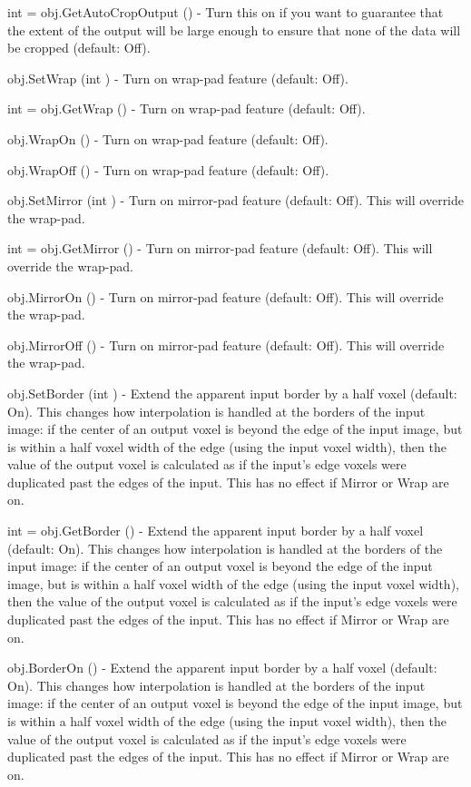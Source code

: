 \begin{DoxyItemize}
\item {\ttfamily int = obj.\-Get\-Auto\-Crop\-Output ()} -\/ Turn this on if you want to guarantee that the extent of the output will be large enough to ensure that none of the data will be cropped (default\-: Off).  
\item {\ttfamily obj.\-Set\-Wrap (int )} -\/ Turn on wrap-\/pad feature (default\-: Off).  
\item {\ttfamily int = obj.\-Get\-Wrap ()} -\/ Turn on wrap-\/pad feature (default\-: Off).  
\item {\ttfamily obj.\-Wrap\-On ()} -\/ Turn on wrap-\/pad feature (default\-: Off).  
\item {\ttfamily obj.\-Wrap\-Off ()} -\/ Turn on wrap-\/pad feature (default\-: Off).  
\item {\ttfamily obj.\-Set\-Mirror (int )} -\/ Turn on mirror-\/pad feature (default\-: Off). This will override the wrap-\/pad.  
\item {\ttfamily int = obj.\-Get\-Mirror ()} -\/ Turn on mirror-\/pad feature (default\-: Off). This will override the wrap-\/pad.  
\item {\ttfamily obj.\-Mirror\-On ()} -\/ Turn on mirror-\/pad feature (default\-: Off). This will override the wrap-\/pad.  
\item {\ttfamily obj.\-Mirror\-Off ()} -\/ Turn on mirror-\/pad feature (default\-: Off). This will override the wrap-\/pad.  
\item {\ttfamily obj.\-Set\-Border (int )} -\/ Extend the apparent input border by a half voxel (default\-: On). This changes how interpolation is handled at the borders of the input image\-: if the center of an output voxel is beyond the edge of the input image, but is within a half voxel width of the edge (using the input voxel width), then the value of the output voxel is calculated as if the input's edge voxels were duplicated past the edges of the input. This has no effect if Mirror or Wrap are on.  
\item {\ttfamily int = obj.\-Get\-Border ()} -\/ Extend the apparent input border by a half voxel (default\-: On). This changes how interpolation is handled at the borders of the input image\-: if the center of an output voxel is beyond the edge of the input image, but is within a half voxel width of the edge (using the input voxel width), then the value of the output voxel is calculated as if the input's edge voxels were duplicated past the edges of the input. This has no effect if Mirror or Wrap are on.  
\item {\ttfamily obj.\-Border\-On ()} -\/ Extend the apparent input border by a half voxel (default\-: On). This changes how interpolation is handled at the borders of the input image\-: if the center of an output voxel is beyond the edge of the input image, but is within a half voxel width of the edge (using the input voxel width), then the value of the output voxel is calculated as if the input's edge voxels were duplicated past the edges of the input. This has no effect if Mirror or Wrap are on.  

\end{DoxyItemize}

